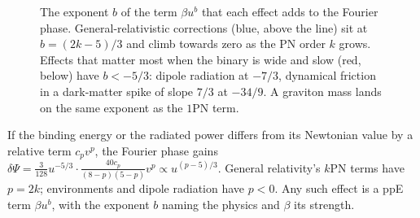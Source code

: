 \begin{figure}[htbp]
\centering
{}
\caption{The exponent $b$ of the term $\beta u^b$ that each effect adds to the Fourier phase. General-relativistic corrections (blue, above the line) sit at $b=(2k-5)/3$ and climb towards zero as the PN order $k$ grows. Effects that matter most when the binary is wide and slow (red, below) have $b<-5/3$: dipole radiation at $-7/3$, dynamical friction in a dark-matter spike of slope $7/3$ at $-34/9$. A graviton mass lands on the same exponent as the $1$PN term.}
\label{T2g:fig:exponents}
\end{figure}

\begin{keyidea}
If the binding energy or the radiated power differs from its Newtonian value by a relative term $c_pv^p$, the Fourier phase gains $\delta\Psi=\tfrac{3}{128}u^{-5/3}\cdot\tfrac{40c_p}{(8-p)(5-p)}v^p\propto u^{(p-5)/3}$. General relativity's $k$PN terms have $p=2k$; environments and dipole radiation have $p<0$. Any such effect is a ppE term $\beta u^b$, with the exponent $b$ naming the physics and $\beta$ its strength.
\end{keyidea}

